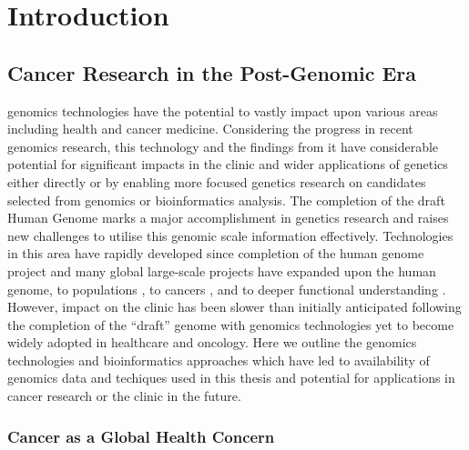 \chapter{Introduction}
\label{chap:intro}







\section{Cancer Research in the Post-Genomic Era}

\Gls{genomics} technologies have the potential to vastly impact upon various areas including health and cancer medicine. Considering the progress in recent \gls{genomics} research, this technology and the findings from it have considerable potential for significant impacts in the clinic and wider applications of genetics either directly or by enabling more focused genetics research on candidates selected from \gls{genomics} or \gls{bioinformatics} analysis. The completion of the draft Human Genome \citep{Lander2001} marks a major accomplishment in genetics research and raises new challenges to utilise this genomic scale information effectively. Technologies in this area have rapidly developed since completion of the human genome project and many global large-scale projects have expanded upon the human genome, to populations \citep{1000Genomes2010}, to cancers \citep{Dickson1999, ICGC2011}, and to deeper functional understanding \citep{ENCODE2004, FANTOM2001}. However, impact on the clinic has been slower than initially anticipated following the completion of the ``draft'' genome with \gls{genomics} technologies yet to become widely adopted in healthcare and oncology. Here we outline the \gls{genomics} technologies and \gls{bioinformatics} approaches which have led to availability of \gls{genomics} data and techiques used in this thesis and potential for applications in cancer research or the clinic in the future. 

\subsection{Cancer as a Global Health Concern}

